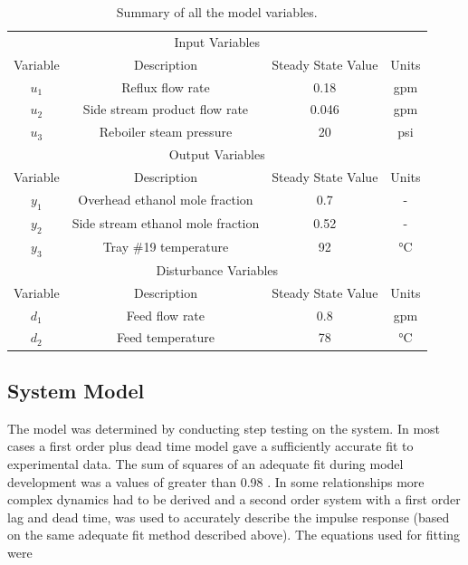 \begin{table}[H]
	\centering
	\caption{Summary of all the model variables.}
	\begin{tabular}{cccc}
		\hline
		\multicolumn{4}{c}{Input Variables}                                       \\
		
		Variable & Description                       & Steady State Value & Units \\
		\hline
		$u_1$       & Reflux flow rate                  & 0.18               & gpm   \\
		$u_2$       & Side stream product flow rate     & 0.046              & gpm   \\
		$u_3$       & Reboiler steam pressure           & 20                 & psi   \\
		\hline
		\multicolumn{4}{c}{Output Variables}                                      \\
		
		Variable & Description                       & Steady State Value & Units \\
		\hline
		$y_1$       & Overhead ethanol mole fraction    & 0.7                & -     \\
		$y_2$       & Side stream ethanol mole fraction & 0.52               & -     \\
		$y_3$       & Tray \#19 temperature             & 92                 & \si{\celsius} \\
		\hline
		\multicolumn{4}{c}{Disturbance Variables}                                 \\
		
		Variable & Description                       & Steady State Value & Units \\
		\hline
		$d_1$       & Feed flow rate                    & 0.8                & gpm   \\
		$d_2$       & Feed temperature                  & 78                 & \si{\celsius} \\\hline
	\end{tabular}
	\label{tab:Variables}
\end{table}


\subsection{System Model}

The model was determined by conducting step testing on the system. In most cases a first order plus dead time model gave a sufficiently accurate fit to experimental data. The sum of squares of an adequate fit during model development was a values of greater than 0.98 \parencite{ogun}. In some relationships more complex dynamics had to be derived and a second order system with a first order lag and dead time, was used to accurately describe the impulse response (based on the same adequate fit method described above). The equations used for fitting were

